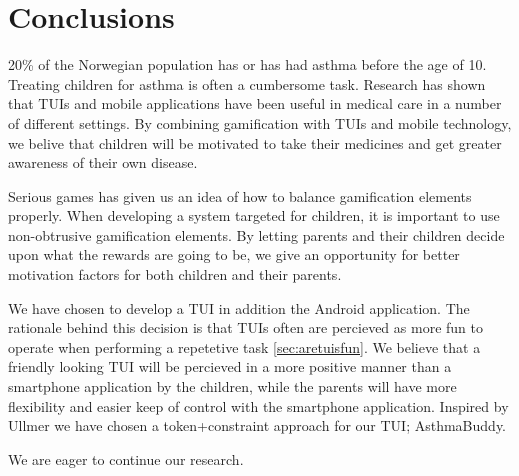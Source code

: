 \chapter{Conclusions}
\label{conclusions}

20\% of the Norwegian population has or has had asthma before the age of 10. Treating children for asthma is often a cumbersome task. Research has shown that TUIs and mobile applications have been useful in medical care in a number of different settings. By combining gamification with TUIs and mobile technology, we belive that children will be motivated to take their medicines and get greater awareness of their own disease.    


Serious games has given us an idea of how to balance gamification elements properly. When developing a system targeted for children, it is important to use non-obtrusive gamification elements. By letting parents and their children decide upon what the rewards are going to be, we give an opportunity for better motivation factors for both children and their parents.   


We have chosen to develop a TUI in addition the Android application. The rationale behind this decision is that TUIs often are percieved as more fun to operate when performing a repetetive task \ref{sec:aretuisfun}. We believe that a friendly looking TUI will be percieved in a more positive manner than a smartphone application by the children, while the parents will have more flexibility and easier keep of control with the smartphone application. Inspired by Ullmer \cite{ullmer2002tangible} we have chosen a token+constraint approach for our TUI; AsthmaBuddy.

We are eager to continue our research.


